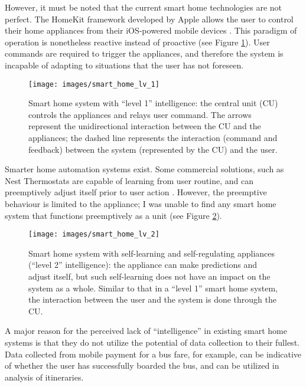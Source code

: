 \documentclass[letterpaper, twocolumn, 10pt, conference]{IEEEtran}
\begin{document}
However, it must be noted that the current smart home technologies are not perfect. The HomeKit\texttrademark{} framework developed by Apple allows the user to control their home appliances from their iOS-powered mobile devices \cite{ritchie2014homekit}. This paradigm of operation is nonetheless reactive instead of proactive (see Figure \ref{fig:smart_home_lv_1}). User commands are required to trigger the appliances, and therefore the system is incapable of adapting to situations that the user has not foreseen.

\begin{figure}[h!]
	\centering
	\texttt{[image: images/smart\_home\_lv\_1]}
	\caption{Smart home system with \enquote{level 1} intelligence: the central unit (CU) controls the appliances and relays user command. The arrows represent the unidirectional interaction between the CU and the appliances; the dashed line represents the interaction (command and feedback) between the system (represented by the CU) and the user.}
	\label{fig:smart_home_lv_1}
\end{figure}

Smarter home automation systems exist. Some commercial solutions, such as Nest Thermostats are capable of learning from user routine, and can preemptively adjust itself prior to user action \cite{pogue2011thermostat}. However, the preemptive behaviour is limited to the appliance; I was unable to find any smart home system that functions preemptively as a unit (see Figure \ref{fig:smart_home_lv_2}).

\begin{figure}[h!]
	\centering
	\texttt{[image: images/smart\_home\_lv\_2]}
	\caption{Smart home system with self-learning and self-regulating appliances (\enquote{level 2} intelligence): the appliance can make predictions and adjust itself, but such self-learning does not have an impact on the system as a whole. Similar to that in a \enquote{level 1} smart home system, the interaction between the user and the system is done through the CU.}
	\label{fig:smart_home_lv_2}
\end{figure}

A major reason for the perceived lack of \enquote{intelligence} in existing smart home systems is that they do not utilize the potential of data collection to their fullest. Data collected from mobile payment for a bus fare, for example, can be indicative of whether the user has successfully boarded the bus, and can be utilized in analysis of itineraries.
\end{document}
